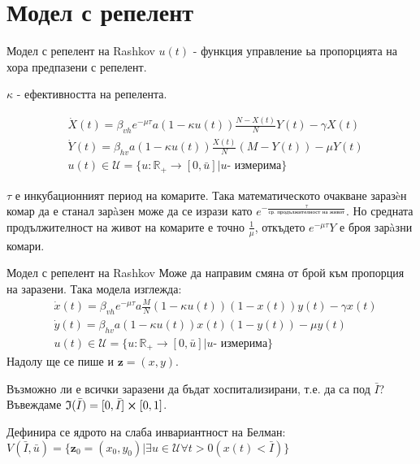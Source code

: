 \section{Модел с репелент}
\begin{frame}[t]{Модел с репелент на Rashkov}
  $u(t)$ - функция управление ьа пропорцията на хора предпазени с репелент.

  $\kappa$ - ефективността на репелента.

  \begin{equation}
    \label{eq:RepellentProblem}
    \begin{split}
      &\dot{X}(t) = \beta_{vh} e^{-\mu \tau} a (1-\kappa u(t)) \frac{N-X(t)}{N} Y(t) - \gamma X(t) \\
      &\dot{Y}(t) = \beta_{hv} a (1-\kappa u(t)) \frac{X(t)}{N} (M-Y(t)) - \mu Y(t) \\
      &u(t) \in \mathscr{U} = \{u:\mathbb{R}_+ \rightarrow [0, \bar{u}] \vert u \text{- измерима}\}
    \end{split}
  \end{equation}

  $\tau$ е инкубационният период на комарите. Така математическото очакване заразèн комар да е станал зарàзен може да се изрази като $e^{-\frac{\tau}{\text{ср. продължителност на живот}}}$. Но средната продължителност на живот на комарите е точно $\frac{1}{\mu}$, откъдето $e^{-\mu\tau}Y$ е броя зарàзни комари.
\end{frame}

\begin{frame}[t]{Модел с репелент на Rashkov}
  Може да направим смяна от брой към пропорция на заразени. Така модела изглежда:
  \begin{equation}
    \begin{split}
      &\dot{x}(t) = \beta_{vh} e^{-\mu \tau} a \frac{M}{N} (1-\kappa u(t)) (1 - x(t)) y(t) - \gamma x(t) \\
      &\dot{y}(t) = \beta_{hv} a (1-\kappa u(t)) x(t) (1 - y(t)) - \mu y(t) \\
      &u(t) \in \mathscr{U} = \{u:\mathbb{R}_+ \rightarrow [0, \bar{u}] \vert u \text{- измерима}\}
    \end{split}
  \end{equation}
  Надолу ще се пише и $\boldsymbol{z}=(x,y)$.

  Възможно ли е всички заразени да бъдат хоспитализирани, т.е. да са под $\bar{I}$?
  Въвеждаме $\mathfrak{I}(\bar{I}) = [0, \bar{I}] \cross [0, 1]$.

  Дефинира се ядрото на слаба инвариантност на Белман:
  $V(\bar{I}, \bar{u}) = \{\boldsymbol{z}_0=(x_0, y_0) \vert \exists{u \in \mathscr{U}}\forall t>0 \left(x(t) < \bar{I}\right)\}$
\end{frame}

